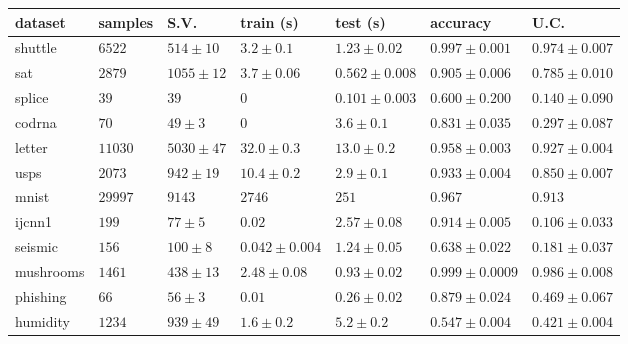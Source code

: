 \begin{tabular}{|l|llllll|}
	\hline
	dataset & samples & S.V. & train (s) & test (s) & accuracy & U.C. \\\hline
shuttle  & $    6522$ & $         514\pm      10$ & $        3.2\pm    0.1$ & $        1.23\pm    0.02$ & $       0.997\pm  0.001$ & $       0.974\pm   0.007$\\
sat  & $    2879$ & $    1055\pm       12$ & $        3.7\pm    0.06$ & $       0.562\pm   0.008$ & $       0.905\pm    0.006$ & $       0.785\pm   0.010$\\
splice  & $          39$ & $          39$ & $           0$ & $       0.101\pm   0.003$ & $       0.600\pm      0.200$ & $       0.140\pm    0.090$\\
codrna  & $          70$ & $        49\pm      3$ & $           0$ & $        3.6\pm     0.1$ & $       0.831\pm    0.035$ & $       0.297\pm    0.087$\\
letter  & $     11030$ & $    5030\pm       47$ & $          32.0\pm     0.3$ & $          13.0\pm     0.2$ & $       0.958\pm   0.003$ & $       0.927\pm   0.004$\\
usps  & $    2073$ & $         942\pm       19$ & $        10.4\pm     0.2$ & $        2.9\pm     0.1$ & $       0.933\pm   0.004$ & $        0.850\pm   0.007$\\
mnist  & $       29997$ & $    9143$ & $    2746$ & $         251$ & $       0.967$ & $       0.913$\\
ijcnn1  & $         199$ & $        77\pm      5$ & $        0.02$ & $        2.57\pm    0.08$ & $       0.914\pm   0.005$ & $       0.106\pm    0.033$\\
seismic  & $         156$ & $         100\pm      8$ & $       0.042\pm   0.004$ & $        1.24\pm    0.05$ & $       0.638\pm    0.022$ & $       0.181\pm    0.037$\\
mushrooms  & $    1461$ & $         438\pm       13$ & $        2.48\pm    0.08$ & $       0.93\pm    0.02$ & $       0.999\pm  0.0009$ & $       0.986\pm   0.008$\\
phishing  & $        66$ & $        56\pm        3$ & $        0.01$ & $       0.26\pm    0.02$ & $       0.879\pm    0.024$ & $       0.469\pm    0.067$\\
humidity  & $    1234$ & $         939\pm       49$ & $        1.6\pm     0.2$ & $        5.2\pm     0.2$ & $       0.547\pm   0.004$ & $       0.421\pm   0.004$\\
\hline
\end{tabular}
